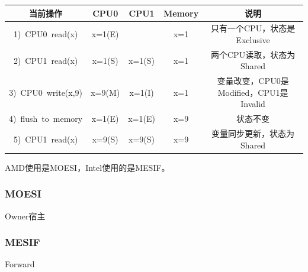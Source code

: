 \begin{tabular}{|c|c|c|c|c|}
    \hline
    \hbox{当前操作} & CPU0 & CPU1 & Memory &  \hbox{说明} \\ \hline
    \hbox{1) CPU0 read(x)} & \hbox{x=1(E)} & & \hbox{x=1} & \hbox{只有一个CPU，状态是Exclusive} \\ \hline
    \hbox{2) CPU1 read(x)} & \hbox{x=1(S)} & \hbox{x=1(S)} & \hbox{x=1} & \hbox{两个CPU读取，状态为Shared} \\ \hline
    \hbox{3) CPU0 write(x,9)} & \hbox{x=9(M)} & \hbox{x=1(I)} & \hbox{x=1} & \hbox{变量改变，CPU0是Modified，CPU1是Invalid} \\ \hline
    \hbox{4) flush to memory} & \hbox{x=1(E)} & \hbox{x=1(E)} & \hbox{x=9} & \hbox{状态不变} \\ \hline
    \hbox{5) CPU1 read(x)} & \hbox{x=9(S)} & \hbox{x=9(S)} & \hbox{x=9} & \hbox{变量同步更新，状态为Shared} \\ \hline
\end{tabular}

AMD使用是MOESI，Intel使用的是MESIF。

\subsubsection{MOESI}

Owner宿主

\subsubsection{MESIF}

Forward


